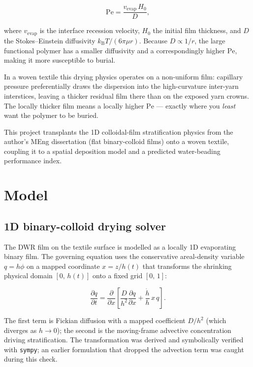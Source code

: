 \documentclass[11pt,a4paper]{article}
\begin{document}
\begin{equation}
  \mathrm{Pe} = \frac{v_\mathrm{evap}\,H_0}{D},
  \label{eq:pe}
\end{equation}

\noindent
where $v_\mathrm{evap}$ is the interface recession velocity, $H_0$ the
initial film thickness, and $D$ the Stokes--Einstein diffusivity
$k_{\mathrm{B}}T/(6\pi\mu r)$.
Because $D \propto 1/r$, the large functional polymer has a smaller
diffusivity and a correspondingly higher $\mathrm{Pe}$, making it more
susceptible to burial.

In a woven textile this drying physics operates on a non-uniform film:
capillary pressure preferentially draws the dispersion into the
high-curvature inter-yarn interstices, leaving a thicker residual film
there than on the exposed yarn crowns.
The locally thicker film means a locally higher $\mathrm{Pe}$ — exactly
where you \emph{least} want the polymer to be buried.

This project transplants the 1D colloidal-film stratification physics from
the author's MEng dissertation (flat binary-colloid films) onto a woven
textile, coupling it to a spatial deposition model and a predicted
water-beading performance index.

\section{Model}

\subsection{1D binary-colloid drying solver}

The DWR film on the textile surface is modelled as a locally 1D evaporating
binary film.
The governing equation uses the conservative areal-density variable
$q = h\phi$ on a mapped coordinate $x = z/h(t)$ that transforms the
shrinking physical domain $[0,\,h(t)]$ onto a fixed grid $[0,\,1]$:

\begin{equation}
  \frac{\partial q}{\partial t}
  = \frac{\partial}{\partial x}
    \!\left[\frac{D}{h^2}\frac{\partial q}{\partial x}
          + \frac{\dot{h}}{h}\,x\,q\right].
  \label{eq:pde}
\end{equation}

The first term is Fickian diffusion with a mapped coefficient $D/h^{2}$
(which diverges as $h \to 0$); the second is the moving-frame advective
concentration driving stratification.
The transformation was derived and symbolically verified with
\texttt{sympy}; an earlier formulation that dropped the advection term was
caught during this check.
\end{document}
